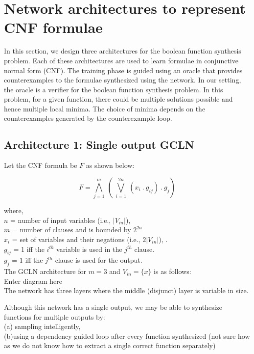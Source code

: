 \clearpage
\section{Network architectures to represent CNF formulae}

In this section,  we design three architectures for the boolean function synthesis problem. Each of these architectures are used to learn formulae in conjunctive normal form (CNF).  The training phase is guided using an oracle that provides counterexamples to the formulae synthesized using the network.  In our setting, the oracle is a verifier for the boolean function synthesis problem.  In this problem,  for a given function, there could be multiple solutions possible and hence multiple local minima.  The choice of minima depends on the counterexamples generated by the counterexample loop.

\subsection{Architecture 1: Single output GCLN}

Let the CNF formula be $F$ as shown below:

\[ F = \bigwedge_{j = 1}^m \ (\  \bigvee_{i=1}^{2n}\  (x_i\ .\ g_{ij})\ .\ g_j)\]

where,  \\ 
$n$ = number of input variables (i.e.,  $|V_{in}|$), \\
$m$ = number of clauses and is bounded by $2^{2n}$ \\
$x_i$ = set of variables and their negations (i.e.,  $2|V_{in}|$), .\\
$g_{ij}$ = 1 iff the $i^{th}$ variable is used in the $j^{th}$ clause.\\
$g_{j}$ = 1 iff the $j^{th}$ clause is used for the output.\\

The GCLN architecture for $m = 3$ and $V_{in} = \{ x\}$ is as follows: \\

Enter diagram here \\

The network has three layers where the middle (disjunct) layer is variable in size.

Although this network has a single output,  we may be able to synthesize functions for multiple outputs by:\\
(a) sampling intelligently,  \\
(b)using a dependency guided loop after every function synthesized (not sure how as we do not know how to extract a single correct function separately)

